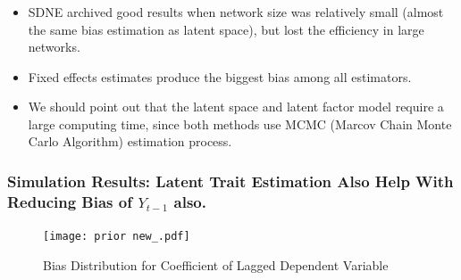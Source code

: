 \documentclass{beamer}
\begin{document}
\begin{frame}
\frametitle{ }
\begin{itemize}

\item SDNE archived good results when network size was relatively small (almost the same bias estimation as latent space), but lost the efficiency in large networks. 
\vspace{10pt}
\item Fixed effects estimates produce the
biggest bias among all estimators.
\vspace{10pt}
\item We should point out that  the latent space and latent factor model require a large computing time, since both methods use MCMC (Marcov Chain Monte Carlo Algorithm) estimation process.
\end{itemize}
\end{frame}

\begin{frame}
\frametitle{Simulation Results: Latent Trait Estimation Also Help With Reducing Bias of $Y_{t-1}$ also.  }
\begin{figure}[H]
  \centering
  \texttt{[image: prior new\_.pdf]}
  \caption{Bias Distribution for Coefficient of Lagged Dependent Variable}
  \label{Fig:fig2}
\end{figure}
\end{frame}
\end{document}
